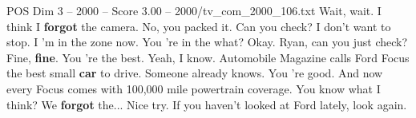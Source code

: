 \begin{textsample}{POS Dim 3 – 2000 – Score 3.00 – 2000/tv\_com\_2000\_106.txt}  \label{ex:f3_pos_081}
Wait, wait.
I think I \textbf{forgot} the camera.
No, you packed it.
Can you check?
I don't want to stop.
I 'm in the zone now.
You 're in the what?
Okay.
Ryan, can you just check?
Fine, \textbf{fine}.
You 're the best.
Yeah, I know.
Automobile Magazine calls Ford Focus the best small \textbf{car} to drive.
Someone already knows.
You 're good.
And now every Focus comes with 100,000 mile powertrain coverage.
You know what I think?
We \textbf{forgot} the...
Nice try.
If you haven't looked at Ford lately, look again.

\end{textsample}
